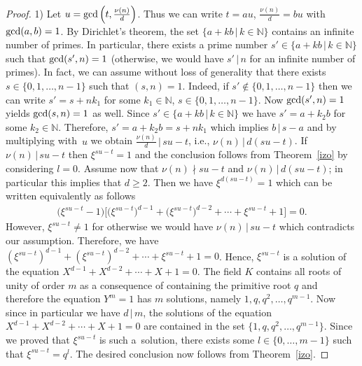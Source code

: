 \documentclass[pdftex]{sigma}
\numberwithin{equation}{section}
\begin{document}
\begin{proof} 1) Let $u = {\rm gcd}\left(t, \frac{\nu(n)}{d}\right)$. Thus we can write $t = au$, $ \frac{\nu(n)}{d} = bu$ with ${\rm gcd}(a, b) = 1$. By Dirichlet's theorem, the set $\{a+kb \,|\, k \in \mathbb{N}\}$ contains an infinite number of primes. In particular, there exists a prime number $s' \in \{a+kb \,|\, k \in \mathbb{N}\}$ such that ${\rm gcd}(s', n) = 1$ (otherwise, we would have $s' \,|\, n$ for an infinite number of primes). In fact, we can assume without loss of generality that there exists $s \in \{0, 1,\dots, n-1\}$ such that $(s, n) = 1$. Indeed, if $s' \notin \{0, 1,\dots, n-1\}$ then we can write $s' = s + nk_{1}$ for some $k_{1} \in \mathbb{N}$, $s \in \{0, 1,\dots, n-1\}$. Now ${\rm gcd}(s', n) = 1$ yields ${\rm gcd}(s, n) = 1$ as well. Since $s' \in \{a+kb \,|\, k \in \mathbb{N}\}$ we have $s' = a + k_{2}b$ for some $k_{2} \in \mathbb{N}$. Therefore, $s' = a + k_{2}b = s + nk_{1}$ which implies $b \,|\, s-a$ and by multiplying with~$u$ we obtain $ \frac{\nu(n)}{d} \,|\, su-t$, i.e., $\nu(n) \,|\, d(su-t)$. If $\nu(n) \,|\, su-t$ then $\xi^{su-t}=1$ and the conclusion follows from Theorem~\ref{izo} by considering $l=0$. Assume now that $\nu(n) \nmid su-t$ and $\nu(n) \,|\, d(su-t)$; in particular this implies that $d \geq 2$. Then we have $\xi^{d(su-t)} = 1$ which can be written equivalently as follows
\begin{gather*}
\big(\xi^{su-t} - 1\big)\big[\big(\xi^{su-t}\big)^{d-1} + \big(\xi^{su-t}\big)^{d-2} + \cdots + \xi^{su-t} +1\big] =0.
\end{gather*}
However, $\xi ^{su-t} \neq 1$ for otherwise we would have $\nu(n) \,|\, su-t$ which contradicts our assumption. Therefore, we have $(\xi^{su-t})^{d-1} + (\xi^{su-t})^{d-2} + \cdots + \xi^{su-t} +1 = 0$. Hence, $\xi^{su-t}$ is a solution of the equation $X^{d-1} + X^{d-2} + \cdots + X + 1 = 0$. The field $K$ contains all roots of unity of order $m$ as a consequence of containing the primitive root $q$ and therefore the equation $Y^{m} = 1$ has $m$ solutions, namely $1, q, q^{2},\dots, q^{m-1}$. Now since in particular we have $d \,|\, m$, the solutions of the equation $X^{d-1} + X^{d-2} + \cdots + X + 1 = 0$ are contained in the set $\{1, q, q^{2}, \dots, q^{m-1}\}$. Since we proved that $\xi^{su-t}$ is such a~solution, there exists some $l \in \{ 0,\dots, m-1 \}$ such that $\xi^{su-t} = q^{l}$. The desired conclusion now follows from Theorem~\ref{izo}.


\end{proof}
\end{document}
